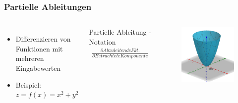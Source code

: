 \begin{frame}
\frametitle{Partielle Ableitungen}

\begin{columns}

\begin{itemize}
\item Differenzieren von Funktionen mit mehreren Eingabewerten
\item Beispiel: $z = f(x) = x^2 + y^2$
\end{itemize}

\hspace{2mm}

\begin{block}{Partielle Ableitung - Notation}
\begin{align*}
\frac{\partial Abzuleitende Fkt.}{\partial Betrachtete Komponente}
\end{align*}
\end{block}

\begin{figure}
\includegraphics[width=\linewidth]{./geschichtliches/adeline/img/partAbl_1_alpha}
\end{figure}

\end{columns}



\end{frame}
